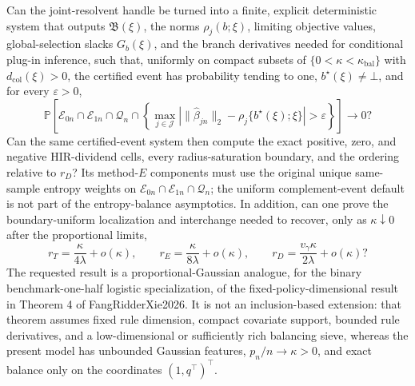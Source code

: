 Can the joint-resolvent handle be turned into a finite, explicit deterministic system that outputs \(\mathfrak B(\xi)\), the norms \(\rho_j(b;\xi)\), limiting objective values, global-selection slacks \(G_b(\xi)\), and the branch derivatives needed for conditional plug-in inference, such that, uniformly on compact subsets of \(\{0<\kappa<\kappa_{\mathrm{bal}}\}\) with \(d_{\mathrm{col}}(\xi)>0\), the certified event has probability tending to one, \(b^\star(\xi)\ne\bot\), and for every \(\varepsilon>0\),
\[
 \mathbb P\!\left[
 \mathcal E_{0n}\cap\mathcal E_{1n}\cap\mathcal Q_n\cap
 \left\{\max_{j\in\mathcal J}
 \left|\|\widehat\beta_{jn}\|_2-
 \rho_j\{b^\star(\xi);\xi\}\right|>\varepsilon\right\}
 \right]\longrightarrow0?
\]
Can the same certified-event system then compute the exact positive, zero, and negative HIR-dividend cells, every radius-saturation boundary, and the ordering relative to \(r_D\)?  Its method-\(E\) components must use the original unique same-sample entropy weights on \(\mathcal E_{0n}\cap\mathcal E_{1n}\cap\mathcal Q_n\); the uniform complement-event default is not part of the entropy-balance asymptotics.  In addition, can one prove the boundary-uniform localization and interchange needed to recover, only as \(\kappa\downarrow0\) after the proportional limits,
\[
 r_T=\frac{\kappa}{4\lambda}+o(\kappa),
 \qquad
 r_E=\frac{\kappa}{8\lambda}+o(\kappa),
 \qquad
 r_D=\frac{v_\gamma\kappa}{2\lambda}+o(\kappa)?
\]
The requested result is a proportional-Gaussian analogue, for the binary benchmark-one-half logistic specialization, of the fixed-policy-dimensional result in Theorem 4 of FangRidderXie2026.  It is not an inclusion-based extension: that theorem assumes fixed rule dimension, compact covariate support, bounded rule derivatives, and a low-dimensional or sufficiently rich balancing sieve, whereas the present model has unbounded Gaussian features, \(p_n/n\to\kappa>0\), and exact balance only on the coordinates \((1,q^\top)^\top\).

